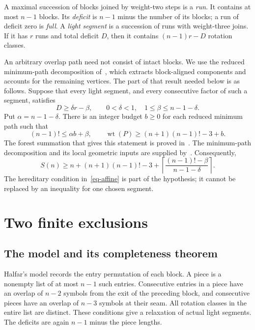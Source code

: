 \documentclass[11pt]{article}
\newcommand{\ceil}[1]{\left\lceil #1\right\rceil}
\DeclareMathOperator{\wt}{wt}
\begin{document}
A maximal succession of blocks joined by weight-two steps is a
\emph{run}. It contains at most $n-1$ blocks. Its \emph{deficit} is
$n-1$ minus the number of its blocks; a run of deficit zero is
\emph{full}. A \emph{light segment} is a succession of runs with
weight-three joins. If it has $r$ runs and total deficit $D$, then it
contains $(n-1)r-D$ rotation classes.

An arbitrary overlap path need not consist of intact blocks. We use the
reduced minimum-path decomposition of~\cite{framework,returns}, which
extracts block-aligned components and accounts for the remaining
vertices. The part of that result needed below is as follows. Suppose
that every light segment, and every consecutive factor of such a
segment, satisfies
\begin{equation}\label{eq-affine}
 D\ge\delta r-\beta,
 \qquad 0<\delta<1,\quad 1\le\beta\le n-1-\delta.
\end{equation}
Put $\alpha=n-1-\delta$. There is an integer budget $b\ge0$ for each
reduced minimum path such that
\begin{equation}\label{eq-forest}
 (n-1)!\le\alpha b+\beta,
 \qquad
 \wt(P)\ge(n+1)(n-1)!-3+b.
\end{equation}
The forest summation that gives this statement is proved
in~\cite{returns}. The minimum-path decomposition and its local geometric
inputs are supplied by~\cite{framework}. Consequently,
\begin{equation}\label{eq-word-bound}
 S(n)\ge n+(n+1)(n-1)!-3+
 \ceil{\frac{(n-1)!-\beta}{n-1-\delta}}.
\end{equation}
The hereditary condition in~\eqref{eq-affine} is part of the hypothesis;
it cannot be replaced by an inequality for one chosen segment.

\section{Two finite exclusions}
\subsection{The model and its completeness theorem}
Halfar's model records the entry permutation of each block. A piece is
a nonempty list of at most $n-1$ such entries. Consecutive entries in a
piece have an overlap of $n-2$ symbols from the exit of the preceding
block, and consecutive pieces have an overlap of $n-3$ symbols at their
seam. All rotation classes in the entire list are distinct. These
conditions give a relaxation of actual light segments. The deficits
are again $n-1$ minus the piece lengths.
\end{document}
